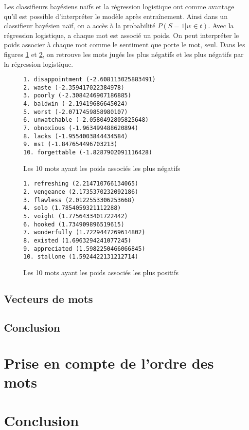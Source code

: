 \documentclass{article}
\begin{document}
Les classifieurs bayésiens naïfs et la régression logistique ont comme avantage qu'il est possible d'interpréter le modèle après entraînement. Ainsi dans un classifieur bayésien naïf, on a accès à la probabilité $P(S=1|w \in t)$. Avec la régression logistique, a chaque mot est associé un poids. On peut interpréter le poids associer à chaque mot comme le sentiment que porte le mot, seul. Dans les figures \ref{negative} et \ref{positive}, on retrouve les mots jugés les plus négatifs et les plus négatifs par la régression logistique.

\begin{figure}[h]
\begin{verbatim}
1. disappointment (-2.608113025883491)
2. waste (-2.359417022384978)
3. poorly (-2.3084246907186885)
4. baldwin (-2.19419686645024)
5. worst (-2.0717459858980107)
6. unwatchable (-2.0580492805825648)
7. obnoxious (-1.963499488620894)
8. lacks (-1.9554003844434584)
9. mst (-1.847654496703213)
10. forgettable (-1.8287902091116428)
\end{verbatim}
\caption{Les 10 mots ayant les poids associés les plus négatifs}
\label{negative}
\end{figure}

\begin{figure}[h]
\begin{verbatim}
1. refreshing (2.214710766134065)
2. vengeance (2.1735370232092186)
3. flawless (2.0122553306253668)
4. solo (1.7854059321112288)
5. voight (1.7756433401722442)
6. hooked (1.734909896519615)
7. wonderfully (1.7229447269614802)
8. existed (1.6963294241077245)
9. appreciated (1.5982250466066845)
10. stallone (1.5924422131212714)
\end{verbatim}
\caption{Les 10 mots ayant les poids associés les plus positifs}
\label{positive}
\end{figure}



\subsection{Vecteurs de mots}


\subsection{Conclusion}



\section{Prise en compte de l'ordre des mots}

\section{Conclusion}



\end{document}
